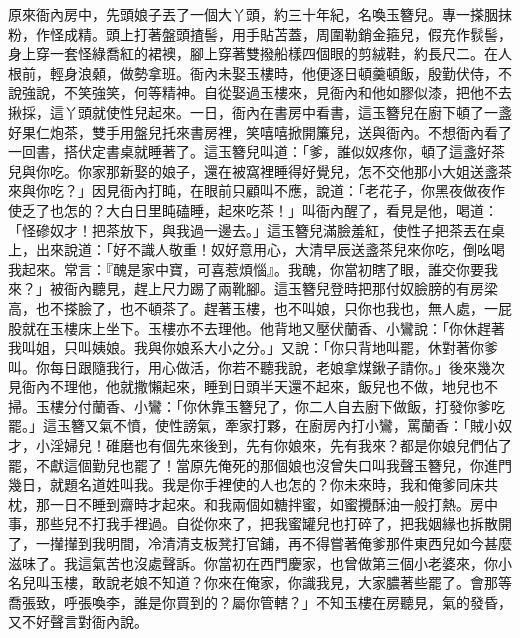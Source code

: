 \begin{showcontents}{}
原來衙內房中，先頭娘子丟了一個大丫頭，約三十年紀，名喚玉簪兒。專一搽胭抹粉，作怪成精。頭上打著盤頭揸髻，用手貼苫蓋，周圍勒銷金箍兒，假充作䯼髻，身上穿一套怪綠喬紅的裙襖，腳上穿著雙撥船樣四個眼的剪絨鞋，約長尺二。在人根前，輕身浪顙，做勢拿班。衙內未娶玉樓時，他便逐日頓羹頓飯，殷勤伏侍，不說強說，不笑強笑，何等精神。自從娶過玉樓來，見衙內和他如膠似漆，把他不去揪採，這丫頭就使性兒起來。一日，衙內在書房中看書，這玉簪兒在廚下頓了一盞好果仁炮茶，雙手用盤兒托來書房裡，笑嘻嘻掀開簾兒，送與衙內。不想衙內看了一回書，搭伏定書桌就睡著了。這玉簪兒叫道：「爹，誰似奴疼你，頓了這盞好茶兒與你吃。你家那新娶的娘子，還在被窩裡睡得好覺兒，怎不交他那小大姐送盞茶來與你吃？」因見衙內打盹，在眼前只顧叫不應，說道：「老花子，你黑夜做夜作使乏了也怎的？大白日里盹磕睡，起來吃茶！」叫衙內醒了，看見是他，喝道：「怪磣奴才！把茶放下，與我過一邊去。」這玉簪兒滿臉羞紅，使性子把茶丟在桌上，出來說道：「好不識人敬重！奴好意用心，大清早辰送盞茶兒來你吃，倒吆喝我起來。常言：『醜是家中寶，可喜惹煩惱』。我醜，你當初瞎了眼，誰交你要我來？」被衙內聽見，趕上尺力踢了兩靴腳。這玉簪兒登時把那付奴臉膀的有房梁高，也不搽臉了，也不頓茶了。趕著玉樓，也不叫娘，只你也我也，無人處，一屁股就在玉樓床上坐下。玉樓亦不去理他。他背地又壓伏蘭香、小鸞說：「你休趕著我叫姐，只叫姨娘。我與你娘系大小之分。」又說：「你只背地叫罷，休對著你爹叫。你每日跟隨我行，用心做活，你若不聽我說，老娘拿煤鍬子請你。」後來幾次見衙內不理他，他就撒懶起來，睡到日頭半天還不起來，飯兒也不做，地兒也不掃。玉樓分付蘭香、小鸞：「你休靠玉簪兒了，你二人自去廚下做飯，打發你爹吃罷。」這玉簪又氣不憤，使性謗氣，牽家打夥，在廚房內打小鸞，罵蘭香：「賊小奴才，小淫婦兒！碓磨也有個先來後到，先有你娘來，先有我來？都是你娘兒們佔了罷，不獻這個勤兒也罷了！當原先俺死的那個娘也沒曾失口叫我聲玉簪兒，你進門幾日，就題名道姓叫我。我是你手裡使的人也怎的？你未來時，我和俺爹同床共枕，那一日不睡到齋時才起來。和我兩個如糖拌蜜，如蜜攪酥油一般打熱。房中事，那些兒不打我手裡過。自從你來了，把我蜜罐兒也打碎了，把我姻緣也拆散開了，一攆攆到我明間，冷清清支板凳打官鋪，再不得嘗著俺爹那件東西兒如今甚麼滋味了。我這氣苦也沒處聲訴。你當初在西門慶家，也曾做第三個小老婆來，你小名兒叫玉樓，敢說老娘不知道？你來在俺家，你識我見，大家膿著些罷了。會那等喬張致，呼張喚李，誰是你買到的？屬你管轄？」不知玉樓在房聽見，氣的發昏，又不好聲言對衙內說。


\end{showcontents}
